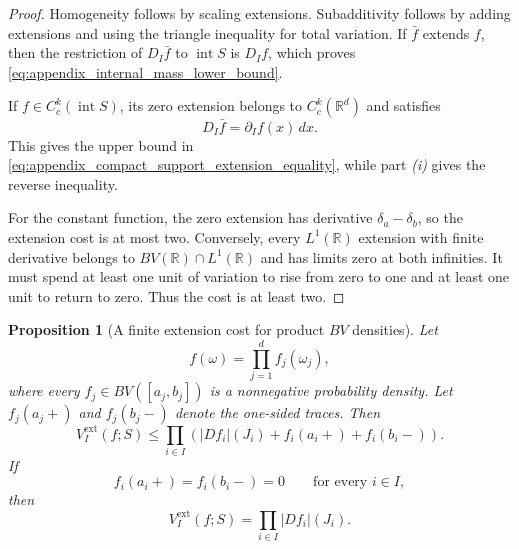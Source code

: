 \documentclass[11pt,letterpaper]{article}
\newtheorem{proposition}[theorem]{Proposition}
\theoremstyle{definition}
\theoremstyle{remark}
\begin{document}
\begin{proof}
Homogeneity follows by scaling extensions. Subadditivity follows by adding
extensions and using the triangle inequality for total variation. If $\bar f$
extends $f$, then the restriction of $D_I\bar f$ to
$\operatorname{int}S$ is $D_If$, which proves
\eqref{eq:appendix_internal_mass_lower_bound}.

If $f\in C_c^k(\operatorname{int}S)$, its zero extension belongs to
$C_c^k(\mathbb R^d)$ and satisfies
$$
D_I\bar f=\partial_If(x)\,dx.
$$
This gives the upper bound in
\eqref{eq:appendix_compact_support_extension_equality}, while part \emph{(i)}
gives the reverse inequality.

For the constant function, the zero extension has derivative
$\delta_a-\delta_b$, so the extension cost is at most two. Conversely, every
$L^1(\mathbb R)$ extension with finite derivative belongs to
$BV(\mathbb R)\cap L^1(\mathbb R)$ and has limits zero at both infinities. It
must spend at least one unit of variation to rise from zero to one and at least
one unit to return to zero. Thus the cost is at least two.
\end{proof}

\begin{proposition}[A finite extension cost for product $BV$ densities]
\label{prop:appendix_product_bv_extension_cost}
Let
$$
f(\omega)=\prod_{j=1}^df_j(\omega_j),
$$
where every $f_j\in BV([a_j,b_j])$ is a nonnegative probability density. Let
$f_j(a_j+)$ and $f_j(b_j-)$ denote the one-sided traces. Then
\begin{equation}
\label{eq:appendix_product_bv_extension_cost}
V_I^{\mathrm{ext}}(f;S)
\le
\prod_{i\in I}
\left(
|Df_i|(J_i)+f_i(a_i+)+f_i(b_i-)
\right).
\end{equation}
If
$$
f_i(a_i+)=f_i(b_i-)=0
\qquad
\text{for every }i\in I,
$$
then
\begin{equation}
\label{eq:appendix_product_bv_extension_equality}
V_I^{\mathrm{ext}}(f;S)
=
\prod_{i\in I}|Df_i|(J_i).
\end{equation}
\end{proposition}
\end{document}
